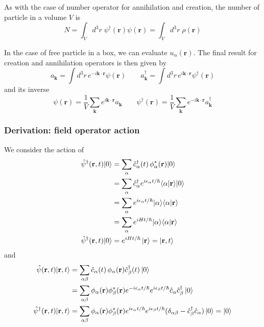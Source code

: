 \documentclass[../../../main.tex]{subfiles}
\begin{document}
As with the case of number operator for annihilation and creation, the number of particle in a volume $V$ is
\begin{equation*}
  N
  = \int_V d^3 r \; \psi^\dagger(\mathbf{r}) \psi(\mathbf{r})
  = \int_V d^3 r \; \rho(\mathbf{r})
\end{equation*}

In the case of free particle in a box, we can evaluate $u_\alpha(\mathbf{r})$.
The final result for creation and annihilation operators is then  given by
\begin{equation*}
  a_\mathbf{k} = \int d^3 r \, e^{-i \mathbf{k} \cdot \mathbf{r}} \psi(\mathbf{r})\qquad
  a_\mathbf{k}^{\dagger} = \int d^3 r \, e^{i \mathbf{k} \cdot \mathbf{r}} \psi^{\dagger}(\mathbf{r})
\end{equation*}
and its inverse
\begin{equation*}
  \psi(\mathbf{r}) = \frac{1}{V} \sum_\mathbf{k} e^{i \mathbf{k} \cdot \mathbf{r}} a_\mathbf{k}\qquad
  \psi^{\dagger}(\mathbf{r}) = \frac{1}{V} \sum_\mathbf{k} e^{-i \mathbf{k} \cdot \mathbf{r}} a_\mathbf{k}^{\dagger}
\end{equation*}

\subsubsection{Derivation: field operator action}
We consider the action of 
\begin{align*}
\hat{\psi} ^\dagger (\mathbf{r},t)\lvert 0\rangle 
&= \sum_\alpha \hat{c}^\dagger_\alpha(t)\,\phi^*_\alpha(\mathbf{r})\lvert 0\rangle \\
& =  \sum_\alpha \hat{c}^\dagger_\alpha e^{i\epsilon_\alpha t/\hbar}\langle \alpha|\mathbf{r}\rangle\lvert 0\rangle \\
&= \sum_\alpha e^{i\epsilon_\alpha t/\hbar}\lvert \alpha\rangle\langle \alpha|\mathbf{r}\rangle \\
&= \sum_{\alpha} e^{i H t/\hbar} \lvert \alpha\rangle\langle \alpha|\mathbf{r}\rangle \\
\hat{\psi} ^\dagger (\mathbf{r},t)\lvert 0\rangle 
& =  e^{i H t/\hbar}\ket{\mathbf{r}} = \ket{\mathbf{r },t}\\
\end{align*}
and
\begin{align*}
\hat{\psi}  (\mathbf{r},t)\lvert \mathbf{r},t\rangle 
&= \sum_{\alpha\beta} \hat{c}_\alpha(t)\,\phi_\alpha(\mathbf{r})\hat{c}_\beta ^\dagger(t) \ket{0}\\
&= \sum_{\alpha\beta} \phi_\alpha(\mathbf{r})\phi_\beta^*(\mathbf{r })e ^{-i \epsilon_\alpha t/\hbar }  e^{i \epsilon_\beta t/\hbar} \hat{c}_\alpha  \hat{c}_\beta ^\dagger \ket{0}\\
\hat{\psi} ^\dagger (\mathbf{r},t)\lvert \mathbf{r }, t \rangle  
&= \sum_{\alpha\beta} \phi_\alpha(\mathbf{r})\phi_\beta^*(\mathbf{r })e ^{i \epsilon_\alpha t/\hbar }  e^{i \epsilon_\beta t/\hbar} (\delta_{\alpha\beta} - \hat{c }^\dagger_\beta \hat{c}_\alpha)\ket{0}
= \ket{0}
\end{align*}
\end{document}

